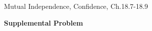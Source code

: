 \documentclass[handout]{mcs}
\begin{document}
\begin{staffnotes}
Mutual Independence, Confidence, Ch.18.7-18.9
\end{staffnotes}






\begin{center}
\textbf{Supplemental Problem}
\end{center}




\end{document}
